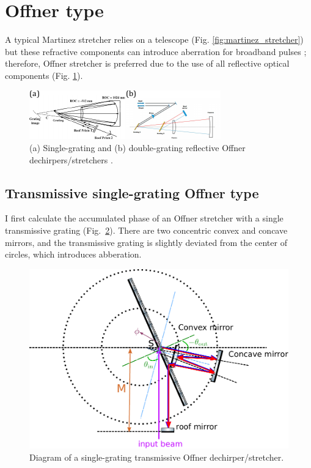 \documentclass[12pt,hidelinks]{book}
\begin{document}
\section{Offner type}
A typical Martinez stretcher relies on a telescope (Fig. \ref{fig:martinez_stretcher}) but these refractive components can introduce aberration for broadband pulses \cite{Cheriaux1996}; therefore, Offner stretcher is preferred due to the use of all reflective optical components (Fig. \ref{fig:Offner_stretcher}).

\begin{figure}[htbp]
\centering
\includegraphics[width=\textwidth]{Offner stretcher.pdf}
\caption{(a) Single-grating \cite{Cheriaux1996} and (b) double-grating reflective Offner dechirpers/stretchers \cite{Liu2020}.}
\label{fig:Offner_stretcher}
\end{figure}

\subsection{Transmissive single-grating Offner type}
I first calculate the accumulated phase of an Offner stretcher with a single transmissive grating (Fig.~\ref{fig:single_Offner_diagram}). There are two concentric convex and concave mirrors, and the transmissive grating is slightly deviated from the center of circles, which introduces abberation.

\begin{figure}[htbp]
\centering
\includegraphics[width=\linewidth]{Offner stretcher (single grating).pdf}
\caption{Diagram of a single-grating transmissive Offner dechirper/stretcher.}
\label{fig:single_Offner_diagram}
\end{figure}
\end{document}
